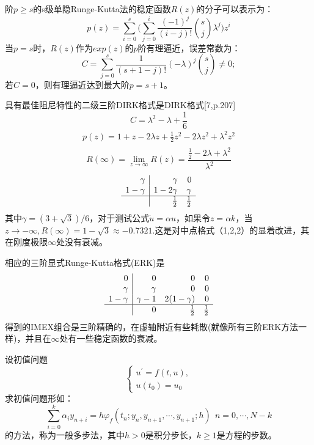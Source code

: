 \documentclass[12pt,a4paper]{article}
\begin{document}
阶$p\ge s$的s级单隐Runge-Kutta法的稳定函数$R(z)$的分子可以表示为：
\begin{equation*}
p(z)=\sum_{i=0}^{s}\bigg(\sum_{j=0}^{i}\frac{(-1)^j}{(i-j)!}\binom{s}{j}\lambda^j\biggl)z^i
\end{equation*}
当$p=s$时，$R(z)$作为$exp(z)$的$p$阶有理逼近，误差常数为：
\begin{equation*}
C=\sum_{j=0}^{s}\frac{1}{(s+1-j)!}(-\lambda)^j\binom{s}{j}\ne 0;
\end{equation*}
若$C=0$，则有理逼近达到最大阶$p=s+1$。

具有最佳阻尼特性的二级三阶DIRK格式是DIRK格式[7,p.207]
\begin{equation*}
C=\lambda^2-\lambda+\frac{1}{6}
\end{equation*}
\begin{gather*}
p(z)=1+z-2\lambda z+\frac{1}{2}z^2-2\lambda z^2+\lambda^2z^2\\
\end{gather*}
\begin{equation*}
R(\infty)=\lim\limits_{z\to \infty}R(z)=\frac{\frac{1}{2}-2\lambda+\lambda^2}{\lambda^2}
\end{equation*}
\[
\begin{array}{r|rr}
\gamma & \gamma & 0 \\
1-\gamma & 1-2\gamma & \gamma  \\
\hline
& \frac{1}{2} & \frac{1}{2}
\end{array}
\]
其中$\gamma=(3+\sqrt{3})/6$，对于测试公式$\dot{u}=\alpha u$，如果令$z=\alpha k$，当$z\to -\infty,R(\infty)=1-\sqrt{3}\approx -0.7321.$这是对中点格式（1,2,2）的显着改进，其在刚度极限$\infty$处没有衰减。

相应的三阶显式Runge-Kutta格式(ERK)是
\[
\begin{array}{r|rrr}
0 & 0 & 0 & 0\\
\gamma & \gamma & 0 & 0\\
1-\gamma & \gamma -1 & 2(1-\gamma ) & 0\\
\hline
& 0 & \frac{1}{2} & \frac{1}{2}
\end{array}
\]
得到的IMEX组合是三阶精确的，在虚轴附近有些耗散(就像所有三阶ERK方法一样)，并且在$\infty$处有一些稳定函数的衰减。

设初值问题
\begin{equation*}
\begin{cases}
u^{'}=f(t,u),\\
u(t_{0})=u_{0}
\end{cases}
\end{equation*}
求初值问题形如：
\begin{equation}
\sum_{i=0}^{k}\alpha_{i}y_{n+i}=h\varphi_{f}(t_{n};y_{n},y_{n+1},\cdots,y_{n+1};h)~~n=0,\cdots,N-k
\label{27}
\end{equation}
的方法，称为一般多步法，其中$h>0$是积分步长，$k\ge 1$是方程的步数。
\end{document}
